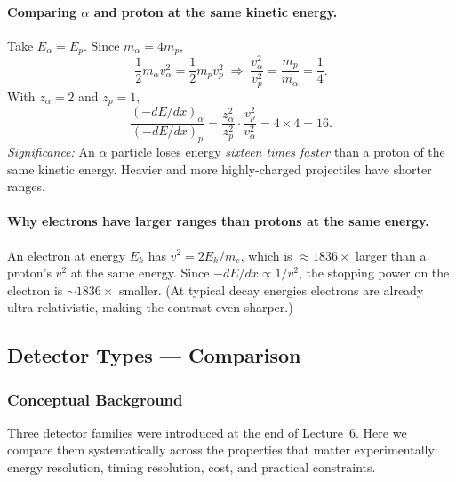 \paragraph{Comparing $\alpha$ and proton at the same kinetic energy.}
Take $E_\alpha = E_p$.  Since $m_\alpha = 4m_p$,
\begin{equation}
  \label{eq:lec07:v_ratio}
  \frac{1}{2}m_\alpha v_\alpha^2 = \frac{1}{2}m_p v_p^2
  \;\Rightarrow\;
  \frac{v_\alpha^2}{v_p^2} = \frac{m_p}{m_\alpha} = \frac{1}{4}.
\end{equation}
With $z_\alpha = 2$ and $z_p = 1$,
\begin{equation}
  \label{eq:lec07:stop_ratio}
  \frac{(-dE/dx)_\alpha}{(-dE/dx)_p}
  = \frac{z_\alpha^2}{z_p^2}\cdot\frac{v_p^2}{v_\alpha^2}
  = 4 \times 4 = \boxed{16}.
\end{equation}
\textit{Significance:} An $\alpha$ particle loses energy \emph{sixteen times faster}
than a proton of the same kinetic energy.  Heavier and more highly-charged
projectiles have shorter ranges.

\paragraph{Why electrons have larger ranges than protons at the same energy.}
An electron at energy $E_k$ has $v^2 = 2E_k/m_e$, which is $\approx 1836\times$
larger than a proton's $v^2$ at the same energy.  Since $-dE/dx \propto 1/v^2$,
the stopping power on the electron is $\sim 1836\times$ smaller.  (At typical
decay energies electrons are already ultra-relativistic, making the contrast
even sharper.)

\subsection{Detector Types — Comparison}
\label{subsec:lec07:detector_comparison}

\subsubsection*{Conceptual Background}
Three detector families were introduced at the end of Lecture~6.  Here we
compare them systematically across the properties that matter experimentally:
energy resolution, timing resolution, cost, and practical constraints.

